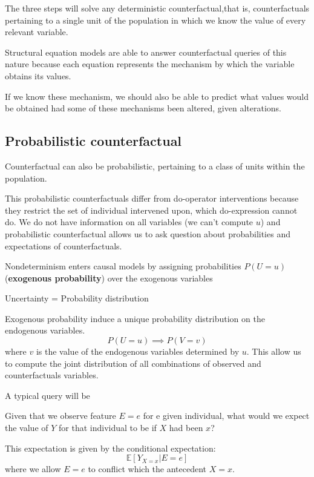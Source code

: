 The three steps will solve any deterministic counterfactual,that is, counterfactuals
pertaining to a single unit of the population in which we know the value of every
relevant variable.

Structural equation models are able to answer counterfactual queries of this nature
because each equation represents the mechanism by which the variable obtains its
values.

If we know these mechanism, we should also be able to predict what values would be
obtained had some of these mechanisms been altered, given alterations.

\subsection{Probabilistic counterfactual}
Counterfactual can also be probabilistic, pertaining to a class of units within
the population.

This probabilistic counterfactuals differ from do-operator interventions because
they restrict the set of individual intervened upon, which do-expression cannot do.
We do not have information on all variables (we can't compute $u$) and probabilistic
counterfactual allows us to ask question about probabilities and expectations of
counterfactuals.

Nondeterminism enters causal models by assigning probabilities $P(U = u)$
(\textbf{exogenous probability}) over the exogenous variables
\begin{center}
    Uncertainty = Probability distribution
\end{center}

Exogenous probability induce a unique probability distribution on the endogenous
variables.
\begin{equation*}
    P(U = u) \implies P(V = v)
\end{equation*}
where $v$ is the value of the endogenous variables determined by $u$. This allow
us to compute the joint distribution of all combinations of observed and
counterfactuals variables.

A typical query will be
\begin{center}
    Given that we observe feature $E = e$ for e given individual, what would we
    expect the value of $Y$ for that individual to be if $X$ had been $x$?
\end{center}
This expectation is given by the conditional expectation:
\begin{equation*}
    \mathbb{E}[Y_{X = x} | E = e]
\end{equation*}
where we allow $E = e$ to conflict which the antecedent $X = x$.

